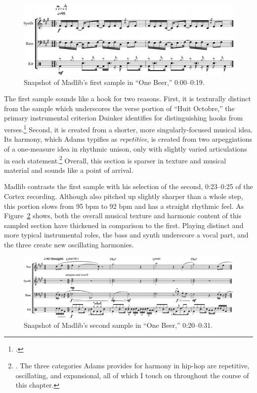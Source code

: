     \begin{figure}[ht]
        \centering
        \includegraphics[width=\textwidth]{images/figures/chp 02/000019onebeerintro.pdf}
        \caption{Snapshot of Madlib's first sample in ``One Beer,'' 0:00--0:19.}
        \label{fig:onebeerintro}
    \end{figure}

The first sample sounds like a hook for two reasons. First, it is texturally distinct from
the sample  which underscores the verse portion of ``Huit Octobre,'' the primary instrumental
criterion Duinker identifies for distinguishing hooks from verses.\footnote{
    \autocite[99]{benduinkerSongFormMainstreaming2020}.}
Second, it is created from a shorter, more singularly-focused musical idea. Its harmony, which
Adams  typifies as \emph{repetitive}, is created from two arpeggiations of a one-measure idea
in rhythmic unison, only with slightly varied articulations in each statement.\footnote{
    \cite{kyleadamsHarmonicSyntacticMotivic2020}. The three categories Adams provides for 
    harmony in hip-hop are repetitive, oscillating, and expansional, all of which I touch on
    throughout the course of this chapter.} 
Overall, this section is sparser in texture and musical material and sounds like a point of
arrival.

Madlib contrasts the first sample with his selection of the second, 0:23--0:25 of the Cortex
recording. Although also pitched up slightly sharper than a whole step, this portion slows 
from 95 bpm to 92 bpm and has a straight rhythmic feel. As Figure~\ref{fig:onebeermain} 
shows, both the overall musical texture and harmonic content of this sampled section have 
thickened in comparison to the first. Playing distinct and more typical instrumental roles,
the bass and synth underscore a vocal part, and the three create new oscillating harmonies.

    \begin{figure}[ht]
        \centering
        \includegraphics[width=\textwidth]{images/figures/chp 02/020031onebeermain.pdf}
        \caption{Snapshot of Madlib's second sample in ``One Beer,'' 0:20--0:31.}
        \label{fig:onebeermain}
    \end{figure}

